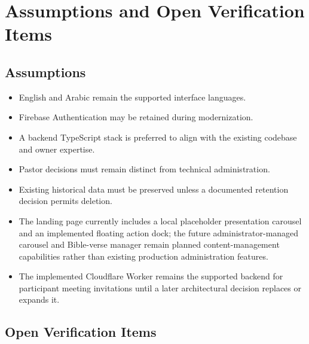 \documentclass[11pt,a4paper,oneside]{report}
\begin{document}
\chapter{Assumptions and Open Verification Items}

\section{Assumptions}

\begin{itemize}
  \item English and Arabic remain the supported interface languages.
  \item Firebase Authentication may be retained during modernization.
  \item A backend TypeScript stack is preferred to align with the existing codebase and owner expertise.
  \item Pastor decisions must remain distinct from technical administration.
  \item Existing historical data must be preserved unless a documented retention decision permits deletion.
  \item The landing page currently includes a local placeholder presentation carousel and an implemented floating action dock; the future administrator-managed carousel and Bible-verse manager remain planned content-management capabilities rather than existing production administration features.
  \item The implemented Cloudflare Worker remains the supported backend for participant meeting invitations until a later architectural decision replaces or expands it.
\end{itemize}

\section{Open Verification Items}
\end{document}
